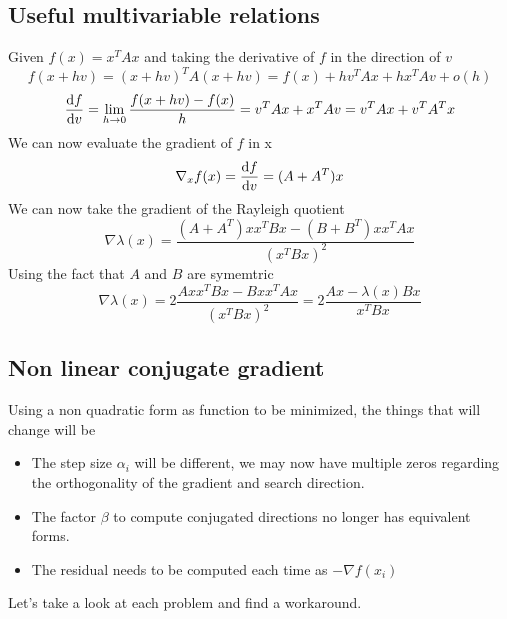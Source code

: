 \documentclass{article}
\begin{document}
\subsection{Useful multivariable relations}
Given $f(x)=x^T Ax$ and taking the derivative of $f$ in the direction of $v$
\begin{equation}
    f(x+hv) = (x+hv)^T A(x+hv) = f(x) + hv^T A x + hx^T A  v + o(h)
\end{equation}
\begin{equation}
    \dv{f}{v} = \lim_{h\to 0} \frac{f(x+hv)-f(x)}{h} = v^T Ax + x^T A v = v^T A x + v^T A^T x
\end{equation}
We can now evaluate the gradient of $f$ in x
\begin{equation}
    \nabla_x f(x) = \dv{f}{v} (x) = (A+A^T)x
\end{equation}
We can now take the gradient of the Rayleigh quotient
\begin{equation}
    \nabla \lambda(x) = \frac{(A+A^T)xx^T Bx - (B+B^T)x x^T Ax }{(x^T Bx)^2} 
\end{equation}
Using the fact that $A$ and $B$ are symemtric
\begin{equation}
\nabla \lambda(x)=2\frac{ Axx^T Bx - Bxx^T Ax}{(x^T Bx)^2}=2\frac{Ax-\lambda(x)Bx}{x^T Bx}
\end{equation}
\subsection{Non linear conjugate gradient}
Using a non quadratic form as function to be minimized, the things that will change will be
\begin{itemize}
\item The step size $\alpha_i$ will be different, we may now have multiple zeros regarding the orthogonality of the gradient and search direction.
\item The factor $\beta$ to compute conjugated directions no longer has equivalent forms.
\item The residual needs to be computed each time as $-\nabla f(x_i)$
\end{itemize}
Let's take a look at each problem and find a workaround.
\end{document}
